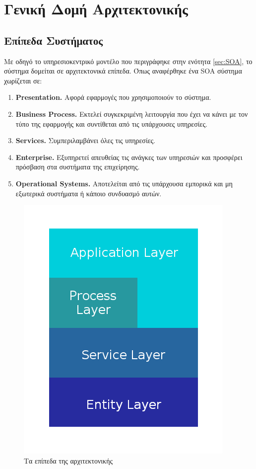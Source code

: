 \chapter{Γενική Δομή Αρχιτεκτονικής}
\label{chap:Arch}

\section{Επίπεδα Συστήματος}

Με οδηγό το υπηρεσιοκεντρικό μοντέλο που περιγράφηκε στην ενότητα
\ref{sec:SOA}, το σύστημα δομείται σε αρχιτεκτονικά επίπεδα. Όπως 
αναφέρθηκε ένα SOA σύστημα χωρίζεται σε:

\begin{enumerate}
\item \textbf{Presentation.} Αφορά εφαρμογές που χρησιμοποιούν το σύστημα.
\item \textbf{Business Process.} Εκτελεί συγκεκριμένη λειτουργία που 
έχει να κάνει με τον τύπο της εφαρμογής και συντίθεται από τις 
υπάρχουσες υπηρεσίες.
\item \textbf{Services.} Συμπεριλαμβάνει όλες τις υπηρεσίες.
\item \textbf{Enterprise.} Εξυπηρετεί απευθείας τις ανάγκες των 
υπηρεσιών και προσφέρει πρόσβαση στα συστήματα της επιχείρησης.
\item \textbf{Operational Systems.} Αποτελείται από τις υπάρχουσα 
εμπορικά και μη εξωτερικά συστήματα ή κάποιο συνδυασμό αυτών.
\setcounter{numberedCntA}{\theenumi}
\end{enumerate}

\begin{figure}[htbp]
  \begin{center}
    \includegraphics[scale=0.35]{Figures/Architecture/Layers.png}
  \end{center}
  \caption{Τα επίπεδα της αρχιτεκτονικής}
  \label{fig:Layers}
\end{figure}

